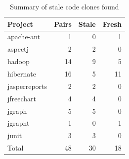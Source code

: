 \documentclass{sig-alternate-05-2015}
\begin{document}
\begin{table}
	\centering
	\caption{Summary of stale code clones found}
	\label{tab:stale_code}
	\small
	\begin{tabular}{l|r|r|r}
		\hline 
		Project & Pairs & Stale & Fresh \\
		\hline
		apache-ant & 1 & 0 & 1 \\
		aspectj & 2 & 2 & 0 \\
		hadoop & 14 & 9 & 5 \\
		hibernate & 16 & 5 & 11 \\
		jasperreports & 2 & 2 & 0 \\
		jfreechart & 4 & 4 & 0 \\
		jgraph & 5 & 5 & 0 \\
		jgrapht & 1 & 0 & 1 \\
		junit & 3 & 3 & 0 \\
		\hline
		Total & 48 & 30 & 18 \\
		\hline
	\end{tabular} 
\end{table}
\end{document}
